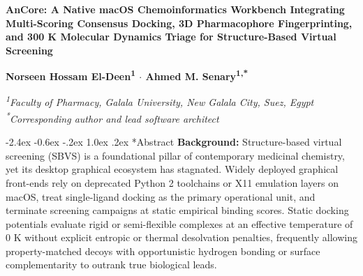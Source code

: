 \documentclass[11pt,a4paper]{article}
\makeatletter
\renewcommand{\subsection}{\@startsection{subsection}{2}{\z@}%
  {-2.4ex \@plus -0.6ex \@minus -.2ex}%
  {1.0ex \@plus .2ex}%
  {\normalfont\large\bfseries\color{primary}}}
\makeatother
\begin{document}
\clearpage
\nopagecolor

\setcounter{page}{1}
{\hypersetup{linkcolor=primary}
\tableofcontents
}
\clearpage

\begin{center}
  {\LARGE\bfseries\color{primary} AnCore: A Native macOS Chemoinformatics Workbench Integrating Multi-Scoring Consensus Docking, 3D Pharmacophore Fingerprinting, and 300 K Molecular Dynamics Triage for Structure-Based Virtual Screening\par}
  \vspace{12pt}
  {\large\bfseries Norseen Hossam El-Deen\textsuperscript{1} \hspace{0.5em}$\cdot$\hspace{0.5em} Ahmed M. Senary\textsuperscript{1,*}\par}
  \vspace{6pt}
  {\normalsize\itshape\color{muted} \textsuperscript{1}Faculty of Pharmacy, Galala University, New Galala City, Suez, Egypt\\[2pt]
  \textsuperscript{*}Corresponding author and lead software architect\par}
\end{center}
\vspace{6pt}

\subsection*{Abstract}
\noindent\textbf{Background:} Structure-based virtual screening (SBVS) is a foundational pillar of contemporary medicinal chemistry, yet its desktop graphical ecosystem has stagnated. Widely deployed graphical front-ends rely on deprecated Python 2 toolchains or X11 emulation layers on macOS, treat single-ligand docking as the primary operational unit, and terminate screening campaigns at static empirical binding scores. Static docking potentials evaluate rigid or semi-flexible complexes at an effective temperature of $0\text{ K}$ without explicit entropic or thermal desolvation penalties, frequently allowing property-matched decoys with opportunistic hydrogen bonding or surface complementarity to outrank true biological leads.
\end{document}
